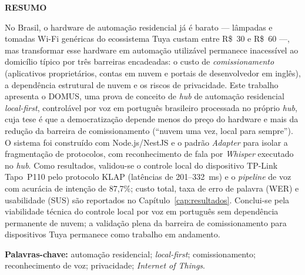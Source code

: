 \newpage
\begin{center}\textbf{RESUMO}\end{center}
\vspace{0.4cm}

\noindent
No Brasil, o hardware de automação residencial já é barato --- lâmpadas e tomadas
Wi-Fi genéricas do ecossistema Tuya custam entre R\$~30 e R\$~60 ---, mas transformar
esse hardware em automação utilizável permanece inacessível ao domicílio típico por
três barreiras encadeadas: o custo de \textit{comissionamento} (aplicativos
proprietários, contas em nuvem e portais de desenvolvedor em inglês), a dependência
estrutural de nuvem e os riscos de privacidade. Este trabalho apresenta o DOMUS, uma
prova de conceito de \textit{hub} de automação residencial \textit{local-first},
controlável por voz em português brasileiro processada no próprio \textit{hub}, cuja
tese é que a democratização depende menos do preço do hardware e mais da redução da
barreira de comissionamento (``nuvem uma vez, local para sempre''). O sistema foi
construído com Node.js/NestJS e o padrão \textit{Adapter} para isolar a fragmentação
de protocolos, com reconhecimento de fala por \textit{Whisper} executado no
\textit{hub}. Como resultados, validou-se o controle local do dispositivo TP-Link
Tapo~P110 pelo protocolo KLAP (latências de 201--332~ms) e o \textit{pipeline} de voz
com acurácia de intenção de 87,7\%; custo total, taxa de erro de palavra (WER) e
usabilidade (SUS) são reportados no Capítulo~\ref{cap:resultados}. Conclui-se pela
viabilidade técnica do controle local por voz em português sem dependência permanente
de nuvem; a validação plena da barreira de comissionamento para dispositivos Tuya
permanece como trabalho em andamento.

\vspace{0.5cm}
\noindent\textbf{Palavras-chave:} automação residencial; \textit{local-first};
comissionamento; reconhecimento de voz; privacidade; \textit{Internet of Things}.
\newpage
